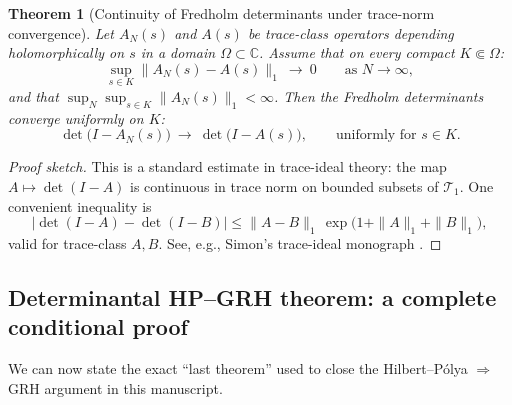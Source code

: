 \documentclass[11pt,oneside]{amsbook}
\numberwithin{equation}{section}
\theoremstyle{plain}
\newtheorem{theorem}{Theorem}[section]
\theoremstyle{definition}
\theoremstyle{remark}
\newcommand{\C}{\mathbb{C}}
\begin{document}
\begin{theorem}[Continuity of Fredholm determinants under trace-norm convergence]
\label{thm:fredholm_det_continuity}
Let $A_N(s)$ and $A(s)$ be trace-class operators depending holomorphically on $s$ in a domain $\Omega\subset\C$.
Assume that on every compact $K\Subset\Omega$:
\[
\sup_{s\in K}\|A_N(s)-A(s)\|_1\ \longrightarrow\ 0
\qquad\text{as }N\to\infty,
\]
and that $\sup_{N}\sup_{s\in K}\|A_N(s)\|_1<\infty$.
Then the Fredholm determinants converge uniformly on $K$:
\[
\det\!\bigl(I-A_N(s)\bigr)\ \longrightarrow\ \det\!\bigl(I-A(s)\bigr),
\qquad \text{uniformly for }s\in K.
\]
\end{theorem}

\begin{proof}[Proof sketch]
This is a standard estimate in trace-ideal theory: the map $A\mapsto \det(I-A)$ is continuous in trace norm on bounded subsets of $\mathcal{T}_1$.
One convenient inequality is
\[
\bigl|\det(I-A)-\det(I-B)\bigr|
\le \|A-B\|_1\,\exp\!\bigl(1+\|A\|_1+\|B\|_1\bigr),
\]
valid for trace-class $A,B$.
See, e.g., Simon's trace-ideal monograph \cite{SimonTraceIdeals}.
\end{proof}

\subsection{Determinantal HP--GRH theorem: a complete conditional proof}
\label{sec:determinantal_HP_GRH_theorem}

We can now state the exact ``last theorem'' used to close the Hilbert--Pólya $\Rightarrow$ GRH argument in this manuscript.
\end{document}
